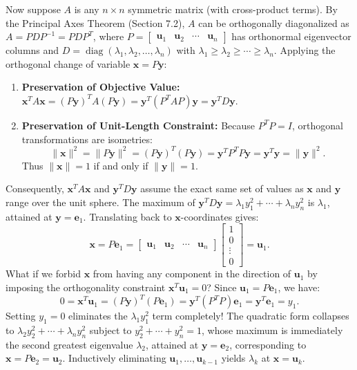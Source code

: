 \documentclass[11pt, letterpaper]{article}
\theoremstyle{definition}
\theoremstyle{remark}
\begin{document}
Now suppose $A$ is any $n \times n$ symmetric matrix (with cross-product terms). By the Principal Axes Theorem (Section 7.2), $A$ can be orthogonally diagonalized as $A = P D P^{-1} = P D P^T$, where $P = \begin{bmatrix} \mathbf{u}_1 & \mathbf{u}_2 & \cdots & \mathbf{u}_n \end{bmatrix}$ has orthonormal eigenvector columns and $D = \operatorname{diag}(\lambda_1, \lambda_2, \dots, \lambda_n)$ with $\lambda_1 \ge \lambda_2 \ge \cdots \ge \lambda_n$. Applying the orthogonal change of variable $\mathbf{x} = P\mathbf{y}$:
\begin{enumerate}[label=\arabic*.]
    \item \textbf{Preservation of Objective Value:} $\mathbf{x}^T A \mathbf{x} = (P\mathbf{y})^T A (P\mathbf{y}) = \mathbf{y}^T (P^T A P)\mathbf{y} = \mathbf{y}^T D \mathbf{y}$.
    \item \textbf{Preservation of Unit-Length Constraint:} Because $P^T P = I$, orthogonal transformations are isometries:
    \[
    \|\mathbf{x}\|^2 = \|P\mathbf{y}\|^2 = (P\mathbf{y})^T(P\mathbf{y}) = \mathbf{y}^T P^T P \mathbf{y} = \mathbf{y}^T \mathbf{y} = \|\mathbf{y}\|^2.
    \]
    Thus $\|\mathbf{x}\| = 1$ if and only if $\|\mathbf{y}\| = 1$.
\end{enumerate}
Consequently, $\mathbf{x}^T A \mathbf{x}$ and $\mathbf{y}^T D \mathbf{y}$ assume the exact same set of values as $\mathbf{x}$ and $\mathbf{y}$ range over the unit sphere. The maximum of $\mathbf{y}^T D \mathbf{y} = \lambda_1 y_1^2 + \cdots + \lambda_n y_n^2$ is $\lambda_1$, attained at $\mathbf{y} = \mathbf{e}_1$. Translating back to $\mathbf{x}$-coordinates gives:
\[
\mathbf{x} = P\mathbf{e}_1 = \begin{bmatrix} \mathbf{u}_1 & \mathbf{u}_2 & \cdots & \mathbf{u}_n \end{bmatrix} \begin{bmatrix} 1 \\ 0 \\ \vdots \\ 0 \end{bmatrix} = \mathbf{u}_1.
\]
What if we forbid $\mathbf{x}$ from having any component in the direction of $\mathbf{u}_1$ by imposing the orthogonality constraint $\mathbf{x}^T \mathbf{u}_1 = 0$? Since $\mathbf{u}_1 = P\mathbf{e}_1$, we have:
\[
0 = \mathbf{x}^T \mathbf{u}_1 = (P\mathbf{y})^T (P\mathbf{e}_1) = \mathbf{y}^T (P^T P)\mathbf{e}_1 = \mathbf{y}^T \mathbf{e}_1 = y_1.
\]
Setting $y_1 = 0$ eliminates the $\lambda_1 y_1^2$ term completely! The quadratic form collapses to $\lambda_2 y_2^2 + \cdots + \lambda_n y_n^2$ subject to $y_2^2 + \cdots + y_n^2 = 1$, whose maximum is immediately the second greatest eigenvalue $\lambda_2$, attained at $\mathbf{y} = \mathbf{e}_2$, corresponding to $\mathbf{x} = P\mathbf{e}_2 = \mathbf{u}_2$. Inductively eliminating $\mathbf{u}_1, \dots, \mathbf{u}_{k-1}$ yields $\lambda_k$ at $\mathbf{x} = \mathbf{u}_k$.
\end{document}
